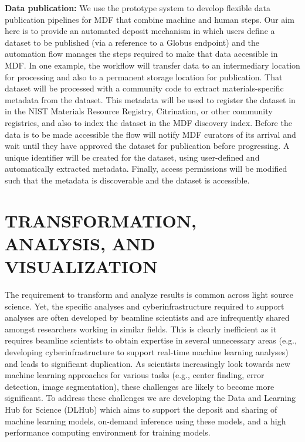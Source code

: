 \documentclass{aip-cp}
\begin{document}
\textbf{Data publication:} We use the prototype system to develop
flexible data publication pipelines for MDF that combine machine and human
steps. Our aim here is to provide an automated deposit mechanism in 
which users define a dataset to be published (via a reference
to a Globus endpoint) and the automation flow manages the steps required
to make that data accessible in MDF. In one example, the workflow
will transfer data to an intermediary location for processing 
and also to a permanent storage location for publication. That 
dataset will be processed with 
a community code to extract materials-specific metadata
from the dataset. This metadata will be used to register the dataset in 
in the NIST Materials Resource Registry, Citrination, or
other community registries, and also to index the dataset
in the MDF discovery index. Before the data is to be made
accessible the flow will notify MDF curators of its arrival
and wait until they have approved the dataset for publication
before progressing. A unique identifier will 
be created for the dataset, using user-defined and automatically
extracted metadata. Finally, access permissions will be 
modified such that the metadata is discoverable
and the dataset is accessible. 


\section{TRANSFORMATION, ANALYSIS, AND VISUALIZATION}

The requirement to transform and analyze results is common across light source science.
Yet, the specific analyses and cyberinfrastructure required to support analyses
are often developed by beamline scientists and are infrequently shared 
amongst researchers working in similar fields. This is clearly inefficient as it 
requires beamline scientists to obtain expertise in several unnecessary areas 
(e.g., developing cyberinfrastructure to support real-time machine learning analyses) 
and leads to significant duplication. 
As scientists increasingly look towards new machine learning approaches for various
tasks (e.g., center finding, error detection, image segmentation), 
these challenges are likely to become more significant. 
To address these challenges we are developing  
the Data and Learning Hub for Science (DLHub) which aims to 
support the deposit and sharing of machine learning models, 
on-demand inference using these models, and a high performance
computing environment for training models. 
\end{document}
